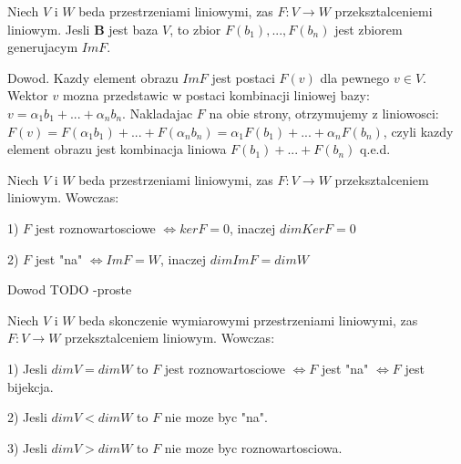 \documentclass{article}
\begin{document}
\begin{tcolorbox}[colback=white!90!red,colframe=black!35!red,title=Fakt 1.21 Obraz przeksztalcenia liniowego]

Niech $V$ i $W$ beda przestrzeniami liniowymi, zas $F: V  \rightarrow W$ przeksztalceniemi liniowym.
Jesli $\mathbf{B}$ jest baza $V$, to zbior $F(b_{1}),...,F(b_{n})$ jest zbiorem generujacym $ImF$.

\end{tcolorbox}
\vspace{5mm}
Dowod.
Kazdy element obrazu $ImF$ jest postaci $F(v)$ dla pewnego $v \in V$. Wektor $v$ mozna przedstawic w postaci kombinacji liniowej bazy: $v = \alpha_{1}b_{1} + ... + \alpha_{n}b_{n}$.
Nakladajac $F$ na obie strony, otrzymujemy z liniowosci:
$F(v) = F(\alpha_{1}b_{1}) + ... + F(\alpha_{n}b_{n}) = \alpha_{1}F(b_{1}) + ... + \alpha_{n}F(b_{n})$, czyli kazdy element obrazu jest kombinacja liniowa $F(b_{1}) + ... + F(b_{n})$     q.e.d. 

\vspace{5mm}
\begin{tcolorbox}[colback=white!90!red,colframe=black!35!red,title=Fakt 1.25 Roznowartosciowosc i "na"]

Niech $V$ i $W$ beda przestrzeniami liniowymi, zas $F: V \rightarrow W$ przeksztalceniem liniowym. Wowczas:

1) $F$ jest roznowartosciowe $\iff kerF = {0}$, inaczej $dimKerF = 0$

2) $F$ jest "na" $\iff ImF = W$, inaczej $dimImF = dimW$


\end{tcolorbox}
\vspace{5mm}
Dowod TODO -proste

\vspace{5mm}
\begin{tcolorbox}[colback=white!90!red,colframe=black!35!red,title=Wniosek 1.26 Bijekcja]

Niech $V$ i $W$ beda skonczenie wymiarowymi przestrzeniami liniowymi, zas $F: V \rightarrow W$ przeksztalceniem liniowym. Wowczas:


1) Jesli $dimV = dimW$ to
    $F$ jest roznowartosciowe $\iff F$ jest "na" $\iff F$ jest bijekcja.

2) Jesli $dimV < dimW$ to $F$ nie moze byc "na".

3) Jesli $dimV > dimW$ to $F$ nie moze byc roznowartosciowa.

\end{tcolorbox}
\vspace{5mm}
\end{document}
